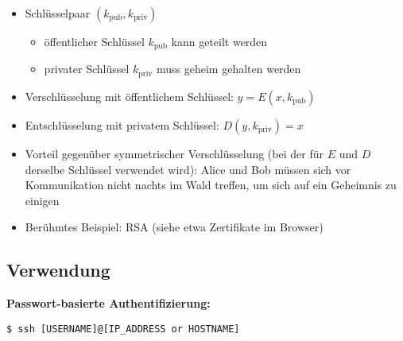\begin{itemize}
	\item Schlüsselpaar $(k_\text{pub}, k_\text{priv})$
	\begin{itemize}
		\item öffentlicher Schlüssel $k_\text{pub}$ kann geteilt werden
		\item privater Schlüssel $k_\text{priv}$ muss geheim gehalten werden
	\end{itemize}
		\item Verschlüsselung mit öffentlichem Schlüssel: $y = E(x, k_\text{pub})$
\item Entschlüsselung mit privatem Schlüssel: $D(y, k_\text{priv}) = x$
\item Vorteil gegenüber symmetrischer Verschlüsselung (bei der für $E$ und $D$ derselbe Schlüssel verwendet wird): Alice und Bob müssen sich vor Kommunikation nicht nachts im Wald treffen, um sich auf ein Geheimnis zu einigen
\item Berühmtes Beispiel: RSA (siehe etwa Zertifikate im Browser)
\end{itemize}
%
%
\subsection{Verwendung}
\textbf{Passwort-basierte Authentifizierung:}
\begin{verbatim}
$ ssh [USERNAME]@[IP_ADDRESS or HOSTNAME]
\end{verbatim}

